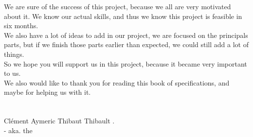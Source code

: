\documentclass[twoside,12pt]{report}	%
\begin{document}
		We are sure of the success of this project, because we all are very motivated about it. We know our actual skills, and thus we know this project is feasible in six months.
		\\
		We also have a lot of ideas to add in our project, we are focused on the principals parts, but if we finish those parts earlier than expected, we could still add a lot of things.
		\\
		So we hope you will support us in this project, because it became very important to us.
		\\
		We also would like to thank you for reading this book of specifications, and maybe for helping us with it.
		\\\\\\
		\phantom{} \hfill Clément  Aymeric  Thibaut  Thibault .
		\\
		\phantom{} \hfill - aka. the 
		
\end{document}
